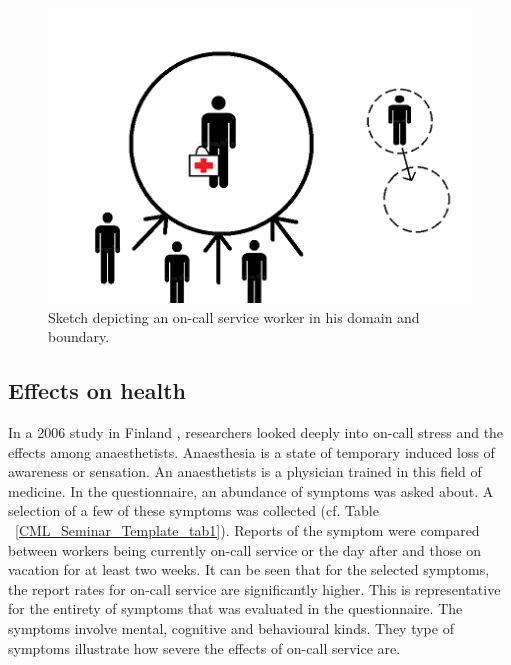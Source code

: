 \documentclass{CML_Seminar_Template}
\begin{document}
\begin{figure}[htb]
  \begin{center}
   \includegraphics{Boundary_sketch_small.PNG}
  \end{center}
    \caption{\label{Boundary_sketch_fig}  Sketch depicting an on-call service worker in his domain and boundary. }
\end{figure}

\subsection{Effects on health}

In a 2006 study in Finland \cite[]{Lindfors2006}, researchers looked deeply into on-call stress and the effects among anaesthetists. Anaesthesia is a state of temporary induced loss of awareness or sensation. An anaesthetists is a physician trained in this field of medicine. In the questionnaire, an abundance of symptoms was asked about. A selection of a few of these symptoms was collected (cf. Table ~\ref{CML_Seminar_Template_tab1}). Reports of the symptom were compared between workers being currently on-call service or the day after and those on vacation for at least two weeks. It can be seen that for the selected symptoms, the report rates for on-call service are significantly higher. This is representative for the entirety of symptoms that was evaluated in the questionnaire. The symptoms involve mental, cognitive and behavioural kinds. They type of symptoms illustrate how severe the effects of on-call service are.
\end{document}
